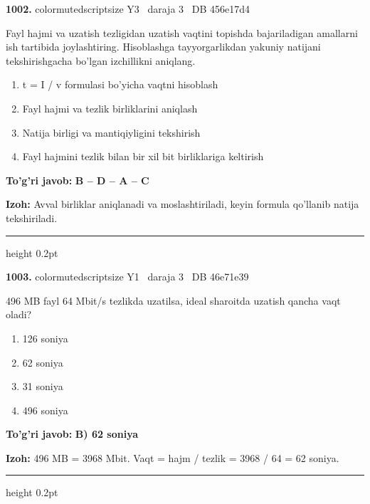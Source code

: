 \documentclass[10pt,a4paper,oneside]{article}
\begin{document}
\noindent\textbf{\color{ink}1002.}  {color{muted}scriptsize Y3 \textbullet\ daraja 3 \textbullet\ DB 456e17d4}
\par
Fayl hajmi va uzatish tezligidan uzatish vaqtini topishda bajariladigan amallarni ish tartibida joylashtiring. Hisoblashga tayyorgarlikdan yakuniy natijani tekshirishgacha bo'lgan izchillikni aniqlang.
\begin{enumerate}[label=\Alph*),leftmargin=9mm]
\item t = I / v formulasi bo'yicha vaqtni hisoblash
\item Fayl hajmi va tezlik birliklarini aniqlash
\item Natija birligi va mantiqiyligini tekshirish
\item Fayl hajmini tezlik bilan bir xil bit birliklariga keltirish
\end{enumerate}
\begin{tcolorbox}[enhanced,breakable,colback=teal!4,colframe=teal!50!black,boxrule=0.5pt,arc=1.1mm,left=3mm,right=3mm,top=1.7mm,bottom=1.7mm,before skip=2mm,after skip=2mm]
\textbf{\color{teal}To'g'ri javob:} \textbf{B -- D -- A -- C}
\par\smallskip
\textbf{Izoh:} Avval birliklar aniqlanadi va moslashtiriladi, keyin formula qo'llanib natija tekshiriladi.
\end{tcolorbox}
\vspace{2mm}\hrule height 0.2pt \vspace{3mm}

\noindent\textbf{\color{ink}1003.}  {color{muted}scriptsize Y1 \textbullet\ daraja 3 \textbullet\ DB 46e71e39}
\par
496 MB fayl 64 Mbit/s tezlikda uzatilsa, ideal sharoitda uzatish qancha vaqt oladi?
\begin{enumerate}[label=\Alph*),leftmargin=9mm]
\item 126 soniya
\item 62 soniya
\item 31 soniya
\item 496 soniya
\end{enumerate}
\begin{tcolorbox}[enhanced,breakable,colback=teal!4,colframe=teal!50!black,boxrule=0.5pt,arc=1.1mm,left=3mm,right=3mm,top=1.7mm,bottom=1.7mm,before skip=2mm,after skip=2mm]
\textbf{\color{teal}To'g'ri javob:} \textbf{B) 62 soniya}
\par\smallskip
\textbf{Izoh:} 496 MB = 3968 Mbit. Vaqt = hajm / tezlik = 3968 / 64 = 62 soniya.
\end{tcolorbox}
\vspace{2mm}\hrule height 0.2pt \vspace{3mm}
\end{document}
